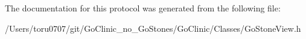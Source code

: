 The documentation for this protocol was generated from the following file:\begin{DoxyCompactItemize}
\item 
/Users/toru0707/git/GoClinic\_\-no\_\-GoStones/GoClinic/Classes/GoStoneView.h\end{DoxyCompactItemize}
